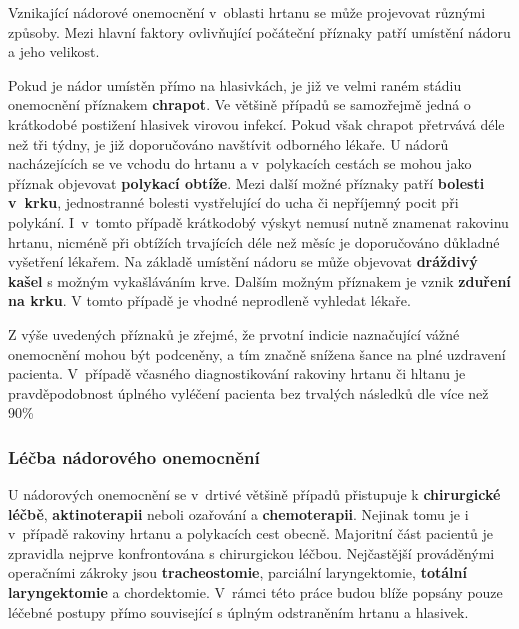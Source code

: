 Vznikající nádorové onemocnění v~oblasti hrtanu se může projevovat různými
způsoby. Mezi hlavní faktory ovlivňující počáteční příznaky patří umístění nádoru a
jeho velikost.

Pokud je nádor umístěn přímo na hlasivkách, je již ve velmi raném stádiu onemocnění příznakem \textbf{chrapot}.
Ve většině případů se samozřejmě jedná o krátkodobé postižení hlasivek virovou infekcí. Pokud však chrapot přetrvává déle než tři týdny, je již doporučováno navštívit odborného lékaře.
U nádorů nacházejících se ve vchodu do hrtanu a v~polykacích cestách se mohou
jako příznak objevovat \textbf{polykací obtíže}. Mezi další možné příznaky
patří \textbf{bolesti v~krku}, jednostranné bolesti vystřelující do ucha či
nepříjemný pocit při polykání. I~v~tomto případě krátkodobý výskyt nemusí
nutně znamenat rakovinu hrtanu, nicméně při obtížích trvajících déle než měsíc
je doporučováno důkladné  vyšetření lékařem.
Na základě umístění nádoru se může objevovat \textbf{dráždivý kašel} s možným
vykašláváním krve. Dalším možným příznakem je vznik \textbf{zduření na krku}.
V tomto případě je vhodné neprodleně vyhledat lékaře.

Z výše uvedených příznaků je zřejmé, že prvotní indicie naznačující vážné onemocnění
mohou být podceněny, a tím značně snížena šance na plné uzdravení pacienta.
V~případě včasného diagnostikování rakoviny hrtanu či hltanu je pravděpodobnost
úplného vyléčení pacienta bez trvalých následků dle \cite{Slavicek2000} více než 90\%



\subsubsection{Léčba nádorového onemocnění} %
\label{chap:cause:desease:cancer:treatment}

U nádorových onemocnění se v~drtivé většině případů přistupuje k
\textbf{chirurgické léčbě}, \textbf{aktinoterapii} neboli ozařování a
\textbf{chemoterapii}. Nejinak tomu je i v~případě rakoviny hrtanu a
polykacích cest obecně. Majoritní část pacientů je zpravidla nejprve
konfrontována s chirurgickou léčbou. Nejčastější prováděnými operačními zákroky jsou
\textbf{tracheostomie}, parciální laryngektomie, \textbf{totální
laryngektomie} a chordektomie. V~rámci této práce budou blíže popsány pouze
léčebné postupy přímo související s úplným odstraněním hrtanu a hlasivek.


